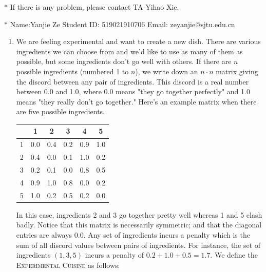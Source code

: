 \documentclass[12pt,a4paper]{article}
\theoremstyle{definition}
\begin{document}
\noindent

\noindent{}
\begin{center}
\footnotesize{\color{red}$*$ If there is any problem, please contact TA Yihao Xie. }

\footnotesize{\color{blue}$*$ Name:Yanjie Ze \quad Student ID: 519021910706 \quad Email: zeyanjie@sjtu.edu.cn}
\end{center}

\begin{enumerate}
    \item We are feeling experimental and want to create a new dish. There are various ingredients we can choose from and we'd like to use as many of them as possible, but some ingredients don't go well with others. If there are $n$ possible ingredients (numbered 1 to $n$), we write down an $n\cdot n$ matrix giving the discord between any pair of ingredients. This discord is a real number between 0.0 and 1.0, where 0.0 means "they go together perfectly" and 1.0 means "they really don't go together." Here's an example matrix when there are five possible ingredients.
    \begin{center}
        \begin{tabular}{|c|ccccc|}
        \hline
             & 1  & 2 & 3 & 4 & 5\\
        \hline
            1 & 0.0 & 0.4 & 0.2 & 0.9 & 1.0\\
            2 & 0.4 & 0.0 & 0.1 & 1.0 & 0.2\\
            3 & 0.2 & 0.1 & 0.0 & 0.8 & 0.5\\
            4 & 0.9 & 1.0 & 0.8 & 0.0 & 0.2\\
            5 & 1.0 & 0.2 & 0.5 & 0.2 & 0.0\\
        \hline
        \end{tabular}
    \end{center}
    In this case, ingredients 2 and 3 go together pretty well whereas 1 and 5 clash badly. Notice that this matrix is necessarily symmetric; and that the diagonal entries are always 0.0. Any set of ingredients incurs a penalty which is the sum of all discord values between pairs of ingredients. For instance, the set of ingredients $(1,3,5)$ incurs a penalty of $0.2+1.0+0.5 = 1.7$. We define the \textsc{Experimental Cuisine} as follows:


\end{enumerate}
\end{document}

